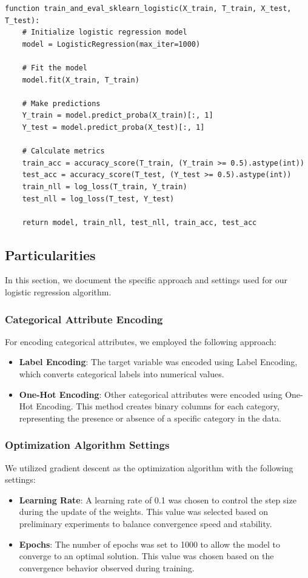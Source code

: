 \documentclass[a4paper,12pt]{article}
\begin{document}
\begin{verbatim}
function train_and_eval_sklearn_logistic(X_train, T_train, X_test, T_test):
    # Initialize logistic regression model
    model = LogisticRegression(max_iter=1000)

    # Fit the model
    model.fit(X_train, T_train)

    # Make predictions
    Y_train = model.predict_proba(X_train)[:, 1]
    Y_test = model.predict_proba(X_test)[:, 1]

    # Calculate metrics
    train_acc = accuracy_score(T_train, (Y_train >= 0.5).astype(int))
    test_acc = accuracy_score(T_test, (Y_test >= 0.5).astype(int))
    train_nll = log_loss(T_train, Y_train)
    test_nll = log_loss(T_test, Y_test)

    return model, train_nll, test_nll, train_acc, test_acc
\end{verbatim}

\subsection{Particularities}

In this section, we document the specific approach and settings used for our logistic regression algorithm.

\subsubsection{Categorical Attribute Encoding}
For encoding categorical attributes, we employed the following approach:
\begin{itemize}
    \item \textbf{Label Encoding}: The target variable was encoded using Label Encoding, which converts categorical labels into numerical values.
    \item \textbf{One-Hot Encoding}: Other categorical attributes were encoded using One-Hot Encoding. This method creates binary columns for each category, representing the presence or absence of a specific category in the data.
\end{itemize}

\subsubsection{Optimization Algorithm Settings}
We utilized gradient descent as the optimization algorithm with the following settings:
\begin{itemize}
    \item \textbf{Learning Rate}: A learning rate of 0.1 was chosen to control the step size during the update of the weights. This value was selected based on preliminary experiments to balance convergence speed and stability.
    \item \textbf{Epochs}: The number of epochs was set to 1000 to allow the model to converge to an optimal solution. This value was chosen based on the convergence behavior observed during training.
\end{itemize}
\newpage
\end{document}
